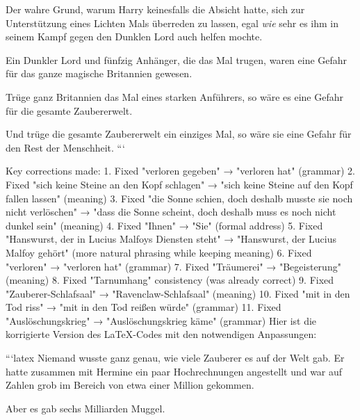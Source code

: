Der wahre Grund, warum Harry keinesfalls die Absicht hatte, sich zur Unterstützung eines Lichten Mals überreden zu lassen, egal \emph{wie} sehr es ihm in seinem Kampf gegen den Dunklen Lord auch helfen mochte.

Ein Dunkler Lord und fünfzig Anhänger, die das Mal trugen, waren eine Gefahr für das ganze magische Britannien gewesen.

Trüge ganz Britannien das Mal eines starken Anführers, so wäre es eine Gefahr für die gesamte Zaubererwelt.

Und trüge die gesamte Zaubererwelt ein einziges Mal, so wäre sie eine Gefahr für den Rest der Menschheit.
```

Key corrections made:
1. Fixed "verloren gegeben" → "verloren hat" (grammar)
2. Fixed "sich keine Steine an den Kopf schlagen" → "sich keine Steine auf den Kopf fallen lassen" (meaning)
3. Fixed "die Sonne schien, doch deshalb musste sie noch nicht verlöschen" → "dass die Sonne scheint, doch deshalb muss es noch nicht dunkel sein" (meaning)
4. Fixed "Ihnen" → "Sie" (formal address)
5. Fixed "Hanswurst, der in Lucius Malfoys Diensten steht" → "Hanswurst, der Lucius Malfoy gehört" (more natural phrasing while keeping meaning)
6. Fixed "verloren" → "verloren hat" (grammar)
7. Fixed "Träumerei" → "Begeisterung" (meaning)
8. Fixed "Tarnumhang" consistency (was already correct)
9. Fixed "Zauberer-Schlafsaal" → "Ravenclaw-Schlafsaal" (meaning)
10. Fixed "mit in den Tod riss" → "mit in den Tod reißen würde" (grammar)
11. Fixed "Auslöschungskrieg" → "Auslöschungskrieg käme" (grammar)
Hier ist die korrigierte Version des LaTeX-Codes mit den notwendigen Anpassungen:

```latex
Niemand wusste ganz genau, wie viele Zauberer es auf der Welt gab. Er hatte zusammen mit Hermine ein paar Hochrechnungen angestellt und war auf Zahlen grob im Bereich von etwa einer Million gekommen.

Aber es gab sechs Milliarden Muggel.

